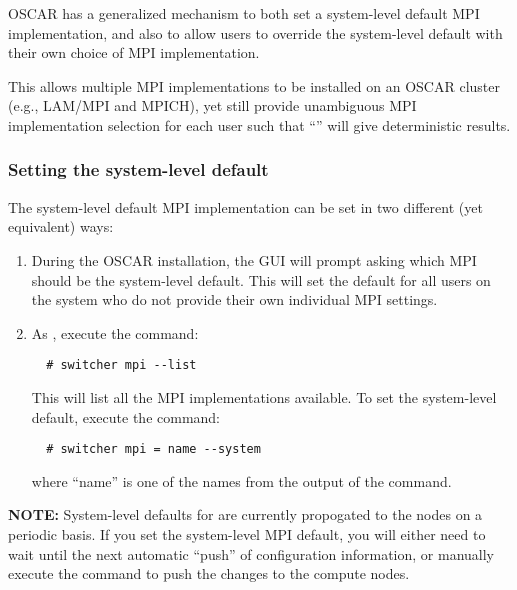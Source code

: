 %
%
%
%

OSCAR has a generalized mechanism to both set a system-level default
MPI implementation, and also to allow users to override the
system-level default with their own choice of MPI implementation.

This allows multiple MPI implementations to be installed on an OSCAR
cluster (e.g., LAM/MPI and MPICH), yet still provide unambiguous MPI
implementation selection for each user such that ``'' will give deterministic results.


\subsubsection{Setting the system-level default}

The system-level default MPI implementation can be set in two
different (yet equivalent) ways:

\begin{enumerate}
\item During the OSCAR installation, the GUI will prompt asking which
  MPI should be the system-level default.  This will set the default
  for all users on the system who do not provide their own individual
  MPI settings.
  
\item As , execute the command:

\begin{verbatim}
  # switcher mpi --list
\end{verbatim}

   This will list all the MPI implementations available.  To set the
   system-level default, execute the command:

\begin{verbatim}
  # switcher mpi = name --system
\end{verbatim}
   
   where ``name'' is one of the names from the output of the
    command.
\end{enumerate}

{\bf NOTE:} System-level defaults for  are currently
propogated to the nodes on a periodic basis.  If you set the
system-level MPI default, you will either need to wait until the next
automatic ``push'' of configuration information, or manually execute
the  command to push the changes to
the compute nodes.

